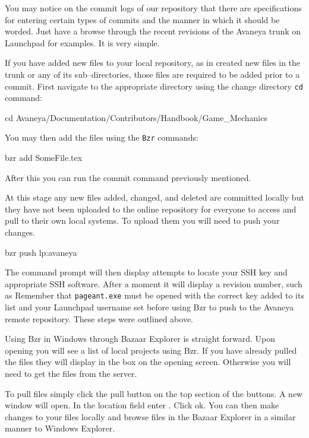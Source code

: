 You may notice on the commit logs of our repository that there are specifications for entering certain types of commits and the manner in which it should be worded. Just have a browse through the recent revisions of the Avaneya trunk on Launchpad for examples. It is very simple.

If you have added new files to your local repository, as in created new files in the trunk or any of its sub--directories, those files are required to be added prior to a commit. First navigate to the appropriate directory using the change directory {\tt cd} command:

\startCodeExample
cd Avaneya/Documentation/Contributors/Handbook/Game_Mechanics
\stopCodeExample

You may then add the files using the {\tt Bzr} commands:

\startCodeExample
bzr add SomeFile.tex
\stopCodeExample

After this you can run the commit command previously mentioned.

At this stage any new files added, changed, and deleted are committed locally but they have not been uploaded to the online repository for everyone to access and pull to their own local systems. To upload them you will need to push your changes.

\startCodeExample
bzr push lp:avaneya
\stopCodeExample

The command prompt will then display attempts to locate your SSH key and appropriate SSH software. After a moment it will display a revision number, such as  Remember that {\tt pageant.exe} must be opened with the correct key added to its list and your Launchpad username set before using Bzr to push to the Avaneya remote repository. These steps were outlined above.



Using Bzr in Windows through Bazaar Explorer is straight forward. Upon opening you will see a list of local projects using Bzr. If you have already pulled the files they will display in the box on the opening screen. Otherwise you will need to get the files from the server.

To pull files simply click the pull button on the top section of the buttons. A new window will open. In the location field enter . Click ok. You can then make changes to your files locally and browse files in the Bazaar Explorer in a similar manner to Windows Explorer.

